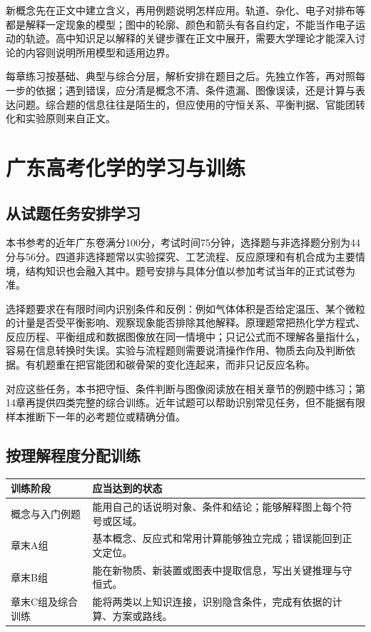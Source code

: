 \documentclass[UTF8,a4paper,zihao=5,oneside,openany,fontset=none]{ctexbook}
\begin{document}
新概念先在正文中建立含义，再用例题说明怎样应用。轨道、杂化、电子对排布等都是解释一定现象的模型；图中的轮廓、颜色和箭头有各自约定，不能当作电子运动的轨迹。高中知识足以解释的关键步骤在正文中展开，需要大学理论才能深入讨论的内容则说明所用模型和适用边界。

每章练习按基础、典型与综合分层，解析安排在题目之后。先独立作答，再对照每一步的依据；遇到错误，应分清是概念不清、条件遗漏、图像误读，还是计算与表达问题。综合题的信息往往是陌生的，但应使用的守恒关系、平衡判据、官能团转化和实验原则来自正文。

\chapter*{广东高考化学的学习与训练}

\section*{从试题任务安排学习}
本书参考的近年广东卷满分100分，考试时间75分钟，选择题与非选择题分别为44分与56分。四道非选择题常以实验探究、工艺流程、反应原理和有机合成为主要情境，结构知识也会融入其中。题号安排与具体分值以参加考试当年的正式试卷为准。

选择题要求在有限时间内识别条件和反例：例如气体体积是否给定温压、某个微粒的计量是否受平衡影响、观察现象能否排除其他解释。原理题常把热化学方程式、反应历程、平衡组成和数据图像放在同一情境中；只记公式而不理解各量指什么，容易在信息转换时失误。实验与流程题则需要说清操作作用、物质去向及判断依据。有机题重在把官能团和碳骨架的变化连起来，而非只记反应名称。

对应这些任务，本书把守恒、条件判断与图像阅读放在相关章节的例题中练习；第14章再提供四类完整的综合训练。近年试题可以帮助识别常见任务，但不能据有限样本推断下一年的必考题位或精确分值。

\section*{按理解程度分配训练}
\begin{center}
\begin{tabularx}{\linewidth}{p{3.0cm}X}
\toprule
训练阶段 & 应当达到的状态\\
\midrule
概念与入门例题 & 能用自己的话说明对象、条件和结论；能够解释图上每个符号或区域。\\
章末A组 & 基本概念、反应式和常用计算能够独立完成；错误能回到正文定位。\\
章末B组 & 能在新物质、新装置或图表中提取信息，写出关键推理与守恒式。\\
章末C组及综合训练 & 能将两类以上知识连接，识别隐含条件，完成有依据的计算、方案或路线。\\
\bottomrule
\end{tabularx}
\end{center}
\end{document}
